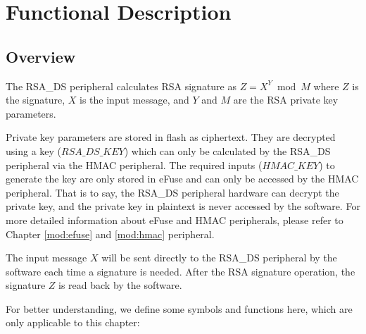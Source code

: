 \documentclass[main\_\_EN.tex]{subfiles}
\begin{document}
\section{Functional Description}
\subsection{Overview}

The RSA\_DS peripheral calculates RSA signature as \begin{math}Z = X^{Y} \bmod M\end{math} where \begin{math}Z\end{math} is the signature, \begin{math}X\end{math} is the input message, and \begin{math}Y\end{math} and \begin{math}M\end{math} are the RSA private key parameters.

Private key parameters are stored in flash as ciphertext. They are decrypted using a key (\begin{math} RSA\_DS\_KEY \end{math}) which can only be calculated by the RSA\_DS peripheral via the HMAC peripheral. The required inputs (\begin{math} HMAC\_KEY \end{math}) to generate the key are only stored in eFuse and can only be accessed by the HMAC peripheral. That is to say, the RSA\_DS peripheral hardware can decrypt the private key, and the private key in plaintext is never accessed by the software. For more detailed information about eFuse and HMAC peripherals, please refer to Chapter \ref{mod:efuse} \textit{} and \ref{mod:hmac} \textit{} peripheral. 

The input message \begin{math}X\end{math} will be sent directly to the RSA\_DS peripheral by the software each time a signature is needed. After the RSA signature operation, the signature \begin{math}Z\end{math} is read back by the software.

For better understanding, we define some symbols and functions here, which are only applicable to this chapter:
\end{document}
